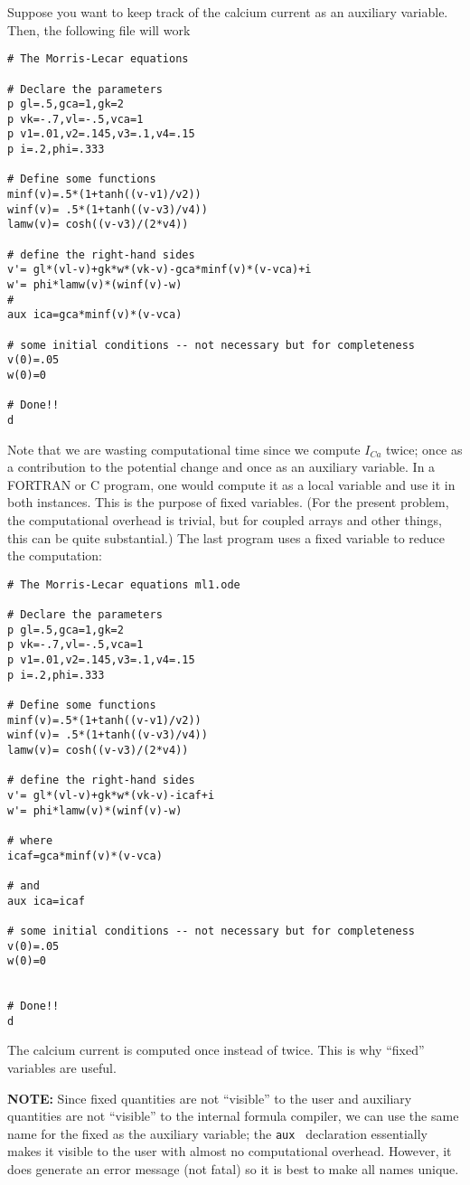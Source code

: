 \documentclass{article}
\begin{document}
Suppose you want to keep track of the calcium current as an auxiliary
variable.  Then, the following file will work
\begin{verbatim}
# The Morris-Lecar equations

# Declare the parameters
p gl=.5,gca=1,gk=2
p vk=-.7,vl=-.5,vca=1
p v1=.01,v2=.145,v3=.1,v4=.15
p i=.2,phi=.333   
  
# Define some functions
minf(v)=.5*(1+tanh((v-v1)/v2))
winf(v)= .5*(1+tanh((v-v3)/v4))
lamw(v)= cosh((v-v3)/(2*v4))

# define the right-hand sides
v'= gl*(vl-v)+gk*w*(vk-v)-gca*minf(v)*(v-vca)+i
w'= phi*lamw(v)*(winf(v)-w)
#
aux ica=gca*minf(v)*(v-vca)

# some initial conditions -- not necessary but for completeness
v(0)=.05
w(0)=0

# Done!!
d
\end{verbatim}
Note that we are wasting computational time
since we compute $I_{Ca}$ twice; once as a contribution to the
potential change and once as an auxiliary variable.  In a FORTRAN or
C program, one would compute it as a local variable and use it in both
instances.  This is the purpose of fixed variables.  (For the present
problem, the computational overhead is trivial, but for coupled arrays
and other things, this can be quite substantial.)  The last program
uses a fixed variable to reduce the computation:
\begin{verbatim}
# The Morris-Lecar equations ml1.ode

# Declare the parameters
p gl=.5,gca=1,gk=2
p vk=-.7,vl=-.5,vca=1
p v1=.01,v2=.145,v3=.1,v4=.15
p i=.2,phi=.333   
  
# Define some functions
minf(v)=.5*(1+tanh((v-v1)/v2))
winf(v)= .5*(1+tanh((v-v3)/v4))
lamw(v)= cosh((v-v3)/(2*v4))

# define the right-hand sides
v'= gl*(vl-v)+gk*w*(vk-v)-icaf+i
w'= phi*lamw(v)*(winf(v)-w)

# where
icaf=gca*minf(v)*(v-vca)

# and
aux ica=icaf

# some initial conditions -- not necessary but for completeness
v(0)=.05
w(0)=0


# Done!!
d
\end{verbatim}
The calcium current is computed once instead of twice.  This is why
``fixed'' variables are useful.


{\bf NOTE:}  Since fixed quantities are not ``visible'' to the user
and auxiliary quantities are not ``visible'' to the internal formula
compiler, we can use the same name for the fixed as the
auxiliary variable; the {\tt aux } declaration essentially makes it
visible to the user with almost no computational overhead. However, it
does generate an error message (not fatal) so it is best to make all
names unique.  
   
\end{document}
